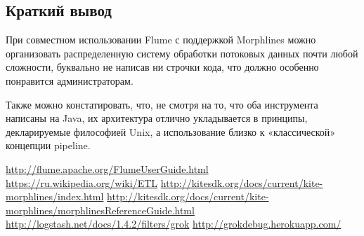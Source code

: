 \documentclass[10pt, a5paper]{article}
\begin{document}
%
%
%
%
\subsection*{Краткий вывод}

При совместном использовании Flume с поддержкой Morphlines можно организовать распределенную систему обработки потоковых данных почти любой сложности, буквально не написав ни строчки кода, что должно особенно понравится администраторам.

Также можно констатировать, что, не смотря на то, что оба инструмента написаны на Java, их архитектура отлично укладывается в принципы, декларируемые философией Unix, а использование близко к «классической» концепции pipeline.
\begin{thebibliography}{9}
 \url{http://flume.apache.org/FlumeUserGuide.html} 
 \url{https://ru.wikipedia.org/wiki/ETL} 
 \url{http://kitesdk.org/docs/current/kite-morphlines/index.html} 
 \url{http://kitesdk.org/docs/current/kite-morphlines/morphlinesReferenceGuide.html} 
 \url{http://logstash.net/docs/1.4.2/filters/grok} 
 \url{http://grokdebug.herokuapp.com/}
\end{thebibliography}
\end{document}
